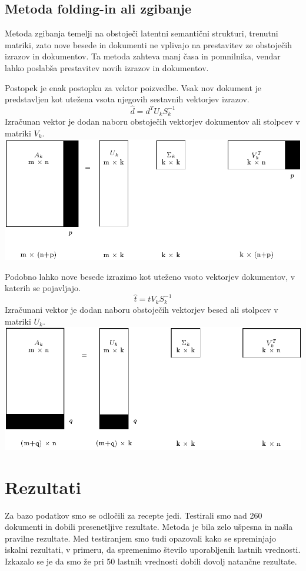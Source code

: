 \documentclass{article}
\begin{document}
\subsection{Metoda \textbf{folding-in} ali zgibanje}
\par Metoda zgibanja temelji na obstoječi latentni semantični strukturi, trenutni matriki, zato nove besede in dokumenti ne vplivajo na prestavitev ze obstoječih izrazov in dokumentov. Ta metoda zahteva manj časa in pomnilnika, vendar lahko poslabša prestavitev novih izrazov in dokumentov.
\par Postopek je enak postopku za vektor poizvedbe. Vsak nov dokument je predstavljen kot utežena vsota njegovih sestavnih vektorjev izrazov.
\[ \hat{d} = d^TU_kS^{-1}_k\]
Izračunan vektor je dodan naboru obstoječih vektorjev dokumentov ali stolpcev v matriki $V_k$. \\

\includegraphics[scale=0.5]{./assets/zaDokumente.png}
\\
\par Podobno lahko nove besede izrazimo kot uteženo vsoto vektorjev dokumentov, v katerih se pojavljajo.
\[ \hat{t} = tV_kS^{-1}_k\]
Izračunani vektor je dodan naboru obstoječih vektorjev besed ali stolpcev v matriki $U_k$. \\

\includegraphics[scale=0.5]{./assets/zaTermine.png}
\newpage

\section{Rezultati}
Za bazo podatkov smo se odločili za recepte jedi. Testirali smo nad 260 dokumenti in dobili presenetljive rezultate. Metoda je bila zelo ušpesna in našla pravilne rezultate. Med testiranjem smo tudi opazovali kako se spreminjajo iskalni rezultati, v primeru, da spremenimo število uporabljenih lastnih vrednosti. Izkazalo se je da smo že pri 50 lastnih vrednosti dobili dovolj natančne rezultate.
\end{document}
